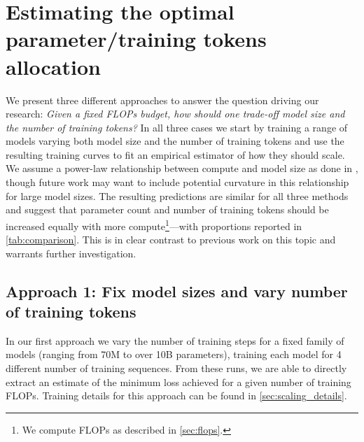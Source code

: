 \section{Estimating the optimal parameter/training tokens allocation}
\label{sec:method}
We present three different approaches to answer the question driving our research: 
\textit{Given a fixed FLOPs budget, how should one trade-off model size and the number of training tokens?} In all three cases we start by training a range of models varying both model size and the number of training tokens and use the resulting training curves to fit an empirical estimator of how they should scale. We assume a power-law relationship between compute and model size as done in \citet{clark2022unified, kaplan2020scaling}, though future work may want to include potential curvature in this relationship for large model sizes. The resulting predictions are similar for all three methods and suggest that parameter count and number of training tokens should be increased equally with more compute\footnote{We compute FLOPs as described in \autoref{sec:flops}.}---with proportions reported in \autoref{tab:comparison}.
This is in clear contrast to previous work on this topic and warrants further investigation.

\subsection{Approach 1: Fix model sizes and vary number of training tokens}

In our first approach we vary the number of training steps for a fixed family of models (ranging from 70M to over 10B parameters), training each model for 4 different number of training sequences. From these runs, we are able to directly extract an estimate of the minimum loss achieved for a given number of training FLOPs. Training details for this approach can be found in \autoref{sec:scaling_details}.

